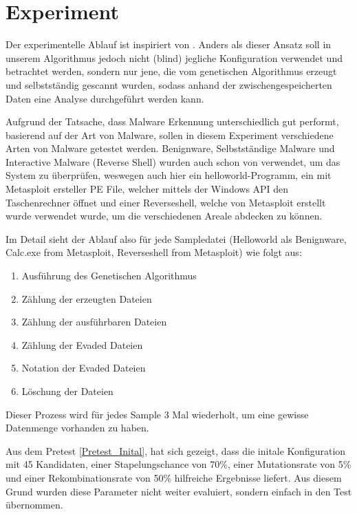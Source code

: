 \section{Experiment}
\label{Sec:Experiment}
Der experimentelle Ablauf ist inspiriert von \cite{holm_2023_hide}. 
Anders als dieser Ansatz soll in unserem Algorithmus jedoch nicht (blind) jegliche Konfiguration verwendet und betrachtet werden, sondern nur jene, die vom genetischen Algorithmus erzeugt und selbstständig gescannt wurden, sodass anhand der zwischengespeicherten Daten eine Analyse durchgeführt werden kann.

Aufgrund der Tatsache, dass Malware Erkennung unterschiedlich gut performt, basierend auf der Art von Malware, sollen in diesem Experiment verschiedene Arten von Malware getestet werden. Benignware, Selbstständige Malware und Interactive Malware (Reverse Shell) wurden auch schon von \cite{holm_2023_hide} verwendet, um das System zu überprüfen, weswegen auch hier ein helloworld-Programm, ein mit Metasploit ersteller PE File, welcher mittels der Windows API den Taschenrechner öffnet und einer Reverseshell, welche von Metasploit erstellt wurde verwendet wurde, um die verschiedenen Areale abdecken zu können.

Im Detail sieht der Ablauf also für jede Sampledatei (Helloworld als Benignware, Calc.exe from Metasploit, Reverseshell from Metasploit) wie folgt aus:
\begin{enumerate}
    \item Ausführung des Genetischen Algorithmus
    \item Zählung der erzeugten Dateien
    \item Zählung der ausführbaren Dateien
    \item Zählung der Evaded Dateien
    \item Notation der Evaded Dateien
    \item Löschung der Dateien
\end{enumerate}
Dieser Prozess wird für jedes Sample 3 Mal wiederholt, um eine gewisse Datenmenge vorhanden zu haben.

Aus dem Pretest \ref{Pretest_Inital}, hat sich gezeigt, dass die initale Konfiguration mit 45 Kandidaten, einer Stapelungschance von 70\%, einer Mutationsrate von 5\% und einer Rekombinationsrate von 50\% hilfreiche Ergebnisse liefert. Aus diesem Grund wurden diese Parameter nicht weiter evaluiert, sondern einfach in den Test übernommen.
